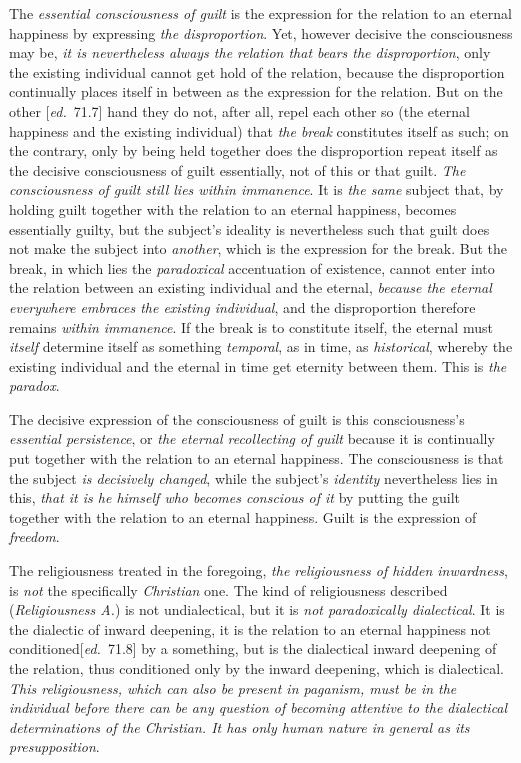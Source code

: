 \documentclass[12pt,a4paper,openany]{book}
\newcommand{\kpage}[1]{\marginnote{\footnotesize\textit{[#1]}}}
\newcommand{\ed}[1]{{\small[\textit{ed.}\ #1]}}
\begin{document}
The \emph{essential consciousness of guilt} is the expression for the relation to an
eternal happiness by expressing \emph{the disproportion}. Yet, however decisive the consciousness
may be, \emph{it is nevertheless always the relation that bears the disproportion}, only
the existing individual cannot get hold of the relation, because the disproportion
continually places itself in between as the expression for the relation. But
on the other \ed{71.7} hand they do not, after all, repel each other so
\kpage{144}(the eternal happiness and the existing individual) that \emph{the break} constitutes itself
as such; on the contrary, only by being held together does the disproportion repeat
itself as the decisive consciousness of guilt essentially,
not of this or that guilt. \emph{The consciousness of guilt still lies within
immanence}. It is \emph{the same} subject that, by holding guilt together
with the relation to an eternal happiness, becomes essentially guilty,
but the subject's ideality is nevertheless such that guilt does not make the subject
into \emph{another}, which is the expression for the break. But the break,
in which lies the \emph{paradoxical} accentuation of existence, cannot enter
into the relation between an existing individual and the eternal, \emph{because the eternal everywhere
embraces the existing individual}, and the disproportion therefore remains \emph{within immanence}.
If the break is to constitute itself, the eternal must \emph{itself} determine
itself as something \emph{temporal}, as in time, as \emph{historical}, whereby the existing individual
and the eternal in time get eternity between them. This is
\emph{the paradox}.

The decisive expression of the consciousness of guilt is this consciousness's
\emph{essential persistence}, or \emph{the eternal recollecting of guilt} because it is continually
put together with the relation to an eternal happiness. The consciousness is
that the subject \emph{is decisively changed}, while the subject's \emph{identity} nevertheless lies
in this, \emph{that it is he himself who becomes conscious of it} by putting the guilt together
with the relation to an eternal happiness. Guilt is the expression of \emph{freedom}.

The religiousness treated in the foregoing, \emph{the religiousness of hidden
inwardness}, is \emph{not} the specifically \emph{Christian} one. The kind of religiousness
described (\emph{Religiousness A.}) is not undialectical, but it is \emph{not
paradoxically dialectical}. It is the dialectic of inward deepening, it is the relation
to an eternal happiness not conditioned\ed{71.8} by a something, but is
the dialectical inward deepening of the relation, thus conditioned only by the inward deepening,
which is dialectical. \emph{This religiousness, which can also be present in
paganism, must be in the individual before there can be any question of becoming attentive
to the dialectical determinations of the Christian. It has only human nature in
general as its presupposition}.
\end{document}
